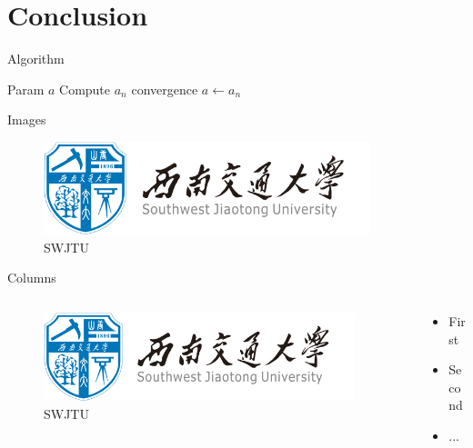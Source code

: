 \documentclass[11pt]{SWJTUBeamer}
\begin{document}
\section{Conclusion}

\begin{frame}{Algorithm}
    \begin{algorithm2e}[H]
        \caption{Algorithm 1}\label{alg:em}
        \begin{algorithmic}[1]
            \REQUIRE Param
            \ENSURE $a$
            \REPEAT
            \STATE Compute $a_n$
            \UNTIL convergence
            \RETURN $a\leftarrow a_n$
        \end{algorithmic}
    \end{algorithm2e}
\end{frame}

\begin{frame}{Images}
    \begin{figure}
        \centering
        \includegraphics[width=0.85\textwidth]{swjtu_logo.png}
        \caption{SWJTU}\label{fig:jtu}
    \end{figure}
\end{frame}

\begin{frame}{Columns}
    \begin{columns}
        \begin{column}{0.3\textwidth}
            \begin{figure}
                \centering
                \includegraphics[width=0.95\textwidth]{swjtu_logo.png}
                \caption{SWJTU}\label{fig:SWJTU}
            \end{figure}
        \end{column}
        \begin{column}{0.7\textwidth}
            \begin{itemize}
                \item First
                \item Second
                \item ...
            \end{itemize}
        \end{column}
    \end{columns}
\end{frame}
\end{document}
